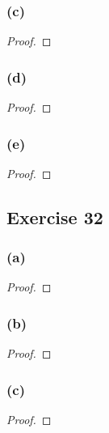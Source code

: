 \documentclass[14pt]{extarticle}
\begin{document}
\subsubsection{(c)}

\begin{proof}

\end{proof}

\subsubsection{(d)}

\begin{proof}

\end{proof}

\subsubsection{(e)}

\begin{proof}

\end{proof}

\subsection{Exercise 32}

\subsubsection{(a)}

\begin{proof}

\end{proof}

\subsubsection{(b)}

\begin{proof}

\end{proof}

\subsubsection{(c)}

\begin{proof}

\end{proof}
\end{document}
